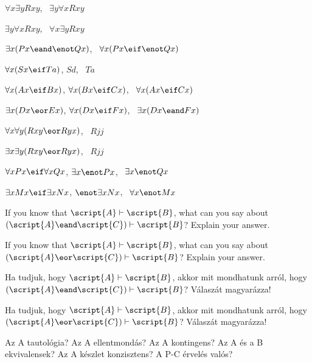 \begin{earg}
\item $\forall x\exists y Rxy$, \therefore\ $\exists y\forall x Rxy$
\item $\exists y\forall x Rxy$, \therefore\ $\forall x\exists y Rxy$
\item $\exists x(Px \eand \enot Qx)$, \therefore\ $\forall x(Px \eif \enot Qx)$
\item $\forall x(Sx \eif Ta)$, $Sd$, \therefore\ $Ta$
\item $\forall x(Ax\eif Bx)$, $\forall x(Bx \eif Cx)$, \therefore\ $\forall x(Ax \eif Cx)$
\item $\exists x(Dx \eor Ex)$, $\forall x(Dx \eif Fx)$, \therefore\ $\exists x(Dx \eand Fx)$
\item $\forall x\forall y(Rxy \eor Ryx)$, \therefore\ $Rjj$
\item $\exists x\exists y(Rxy \eor Ryx)$, \therefore\ $Rjj$
\item $\forall x Px \eif \forall x Qx$, $\exists x \enot Px$, \therefore\ $\exists x \enot Qx$
\item $\exists x Mx \eif \exists x Nx$, $\enot \exists x Nx$, \therefore\ $\forall x \enot Mx$
\end{earg}



\problempart
\begin{earg}
\item If you know that $\script{A}\vdash\script{B}$, what can you say about $(\script{A}\eand\script{C})\vdash\script{B}$? Explain your answer.
\item If you know that $\script{A}\vdash\script{B}$, what can you say about $(\script{A}\eor\script{C})\vdash\script{B}$? Explain your answer.
\end{earg}

\problempart
\begin{earg}
\item Ha tudjuk, hogy  $\script{A}\vdash\script{B}$, akkor mit mondhatunk arról, hogy $(\script{A}\eand\script{C})\vdash\script{B}$? Válaszát magyarázza!
\item Ha tudjuk, hogy  $\script{A}\vdash\script{B}$, akkor mit mondhatunk arról, hogy $(\script{A}\eor\script{C})\vdash\script{B}$? Válaszát magyarázza!
\end{earg}


Az A tautológia?
Az A ellentmondás?
Az A kontingens?
Az A és a B ekvivalensek?
Az A készlet konzisztens?
A P-C érvelés valós?

